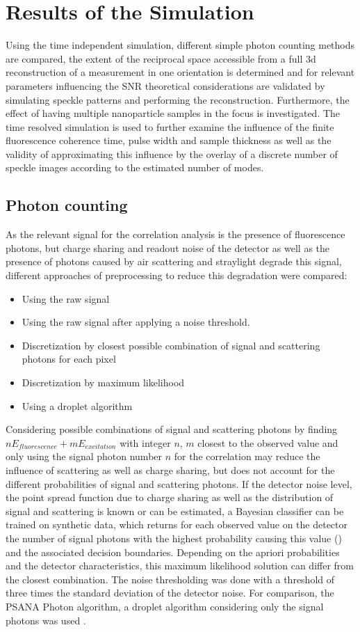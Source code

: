 \section{Results of the Simulation}
Using the time independent simulation, different simple photon counting methods are compared, the extent of the reciprocal space accessible from a full 3d reconstruction of a measurement in one orientation is determined and for relevant parameters influencing the SNR theoretical considerations are validated by simulating speckle patterns and performing the reconstruction. Furthermore, the effect of having multiple nanoparticle samples in the focus is investigated. The time resolved simulation is used to further examine the influence of the finite fluorescence coherence time, pulse width and sample thickness as well as the validity of approximating this influence by the overlay of a discrete number of speckle images according to the estimated number of modes.

\subsection{Photon counting}
As the relevant signal for the correlation analysis is the presence of fluorescence photons, but charge sharing and readout noise of the detector as well as the presence of photons caused by air scattering and straylight degrade this signal, different approaches of preprocessing to reduce this degradation were compared:

\begin{itemize}[nosep]
	\item Using the raw signal
	\item Using the raw signal after applying a noise threshold.
	\item Discretization by closest possible combination of signal and scattering photons for each pixel
	\item Discretization by maximum likelihood
	\item Using a droplet algorithm
\end{itemize}

Considering possible combinations of signal and scattering photons by finding  $nE_{fluorescence}+mE_{excitation}$ with integer $n$, $m$ closest to the observed value and only using the signal photon number $n$ for the correlation may reduce the influence of scattering as well as charge sharing, but does not account for the different probabilities of signal and scattering photons. If the detector noise level, the point spread function due to charge sharing as well as the distribution of signal and scattering is known or can be estimated, a Bayesian classifier can be trained on synthetic data, which returns for each observed value on the detector the number of signal photons with the highest probability causing this value () and the associated decision boundaries. Depending on the apriori probabilities and the detector characteristics, this maximum likelihood solution can differ from the closest combination. The noise thresholding was done with a threshold of three times the standard deviation of the detector noise. For comparison, the PSANA Photon algorithm, a droplet algorithm considering only the signal photons was used \cite{psana}.

